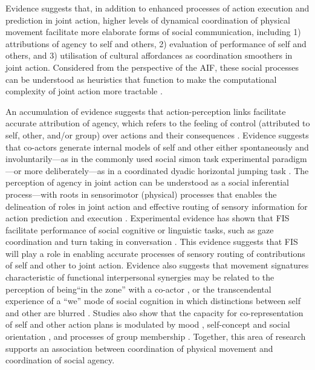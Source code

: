 \begin{CJK}{UTF8}{gbsn}
Evidence suggests that, in addition to enhanced processes of action execution and prediction in joint action, higher levels of dynamical coordination of physical movement facilitate more elaborate forms of social communication, including 1) attributions of agency to self and others,  2) evaluation of performance of self and others, and 3) utilisation of cultural affordances as coordination smoothers in joint action. Considered from the perspective of the AIF, these social processes can be understood as heuristics that function to make the computational complexity of joint action more tractable \citep{Moutoussis2014}.

An accumulation of evidence suggests that action-perception links facilitate accurate attribution of agency, which refers to the feeling of control (attributed to self, other, and/or group) over actions and their consequences \citep{Moore2016}.
Evidence suggests that co-actors generate internal models of self and other either spontaneously and involuntarily---as in the commonly used social simon task experimental paradigm \citep{Sebanz2003,Atmaca2008}---or more deliberately---as in a coordinated dyadic horizontal jumping task \citep{Vesper2012}.  The perception of agency in joint action can be understood as a social inferential process---with roots in sensorimotor (physical) processes that enables the delineation of roles in joint action and effective routing of sensory information for action prediction and execution \citep{Sato2008,Friston2015,Kelso2016}.  Experimental evidence has shown that FIS facilitate performance of social cognitive or linguistic tasks, such as gaze coordination and turn taking in conversation \citep{Miles2010,Richardson2005,Shockley2009}.  This evidence suggests that FIS will play a role in enabling accurate processes of sensory routing of contributions of self and other to joint action.
Evidence also suggests that movement signatures characteristic of functional interpersonal synergies may be related to the perception of  being``in the zone'' with a co-actor \citep{Noy2011,Noy2015,Hart2014}, or the transcendental experience of a ``we'' mode of social cognition in which distinctions between self and other are blurred \citep{Gallotti2013}.  Studies also show that the capacity for co-representation of self and other action plans is modulated by mood \citep[positive or negative affect, see][]{Kuhbandner2010}, self-concept and social orientation \citep{Colzato2012,Colzato2012a}, and processes of group membership \citep{DeBruijn2008,Aquino2015}.  Together, this area of research supports an association between coordination of physical movement and coordination of social agency.


\end{CJK}
